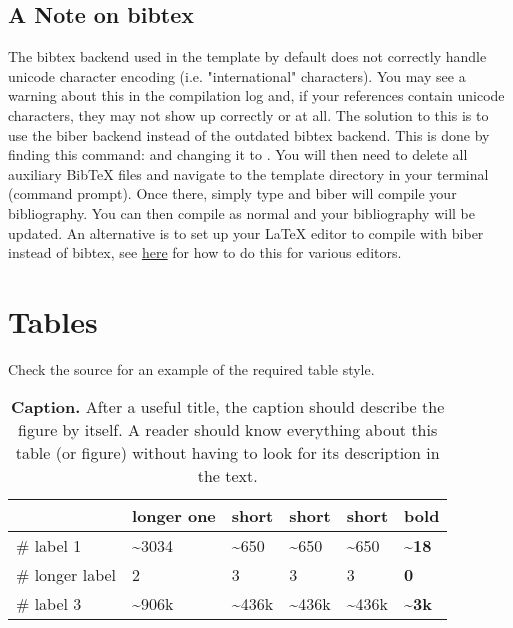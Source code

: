 \subsection{A Note on bibtex}

The bibtex backend used in the template by default does not correctly handle unicode character encoding (i.e. "international" characters). You may see a warning about this in the compilation log and, if your references contain unicode characters, they may not show up correctly or at all. The solution to this is to use the biber backend instead of the outdated bibtex backend. This is done by finding this command:  and changing it to . You will then need to delete all auxiliary BibTeX files and navigate to the template directory in your terminal (command prompt). Once there, simply type  and biber will compile your bibliography. You can then compile  as normal and your bibliography will be updated. An alternative is to set up your LaTeX editor to compile with biber instead of bibtex, see \href{http://tex.stackexchange.com/questions/154751/biblatex-with-biber-configuring-my-editor-to-avoid-undefined-citations/}{here} for how to do this for various editors.

\section{Tables}

Check the source for an example of the required table style.

\begin{table}[h!] %
\caption[Example]{%
  \textbf{Caption.}
  After a useful title, the caption should describe the figure by itself. A reader should know everything about this table (or figure) without having to look for its description in the text.
}
\label{tab:example}
\center
\begin{tabular}{m{25mm}lllll}
  \toprule
  & longer one & short & short & short & \textbf{bold} \\
  \midrule
  \# label 1       & {\textasciitilde{}}3034 & {\textasciitilde{}}650 & {\textasciitilde{}}650  & {\textasciitilde{}}650  & \textbf{{\textasciitilde{}}18} \\
  \# longer label & 2 & 3 & 3 & 3 & \textbf{0} \\
  \# label 3   & {\textasciitilde{}}906k & {\textasciitilde{}}436k & {\textasciitilde{}}436k & {\textasciitilde{}}436k & \textbf{{\textasciitilde{}}}\textbf{3k}\\
  \bottomrule
  \end{tabular}
\end{table}

